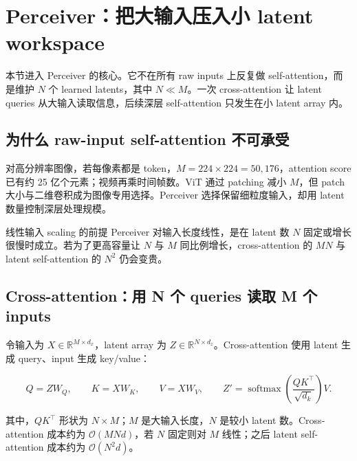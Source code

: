 \section{Perceiver：把大输入压入小 latent workspace}

本节进入 Perceiver 的核心。它不在所有 raw inputs 上反复做 self-attention，而是维护 $N$ 个 learned latents，其中 $N\ll M$。一次 cross-attention 让 latent queries 从大输入读取信息，后续深层 self-attention 只发生在小 latent array 内。


\subsection{为什么 raw-input self-attention 不可承受}

对高分辨率图像，若每像素都是 token，$M=224\times224=50{,}176$，attention score 已有约 25 亿个元素；视频再乘时间帧数。ViT 通过 patching 减小 $M$，但 patch 大小与二维卷积成为图像专用选择。Perceiver 选择保留细粒度输入，却用 latent 数量控制深层处理规模。


\begin{warningbox}{线性输入 scaling 的前提}
Perceiver 对输入长度线性，是在 latent 数 $N$ 固定或增长很慢时成立。若为了更高容量让 $N$ 与 $M$ 同比例增长，cross-attention 的 $MN$ 与 latent self-attention 的 $N^2$ 仍会变贵。
\end{warningbox}

\subsection{Cross-attention：用 N 个 queries 读取 M 个 inputs}

令输入为 $X\in\mathbb{R}^{M\times d_x}$，latent array 为 $Z\in\mathbb{R}^{N\times d_z}$。Cross-attention 使用 latent 生成 query、input 生成 key/value：

\[
Q=ZW_Q,\qquad K=XW_K,\qquad V=XW_V,
\qquad
Z'=\operatorname{softmax}\!\left(\frac{QK^\top}{\sqrt{d_k}}\right)V.
\]

其中，$QK^\top$ 形状为 $N\times M$；$M$ 是大输入长度，$N$ 是较小 latent 数。Cross-attention 成本约为 $\mathcal{O}(MNd)$，若 $N$ 固定则对 $M$ 线性；之后 latent self-attention 成本约为 $\mathcal{O}(N^2d)$。

